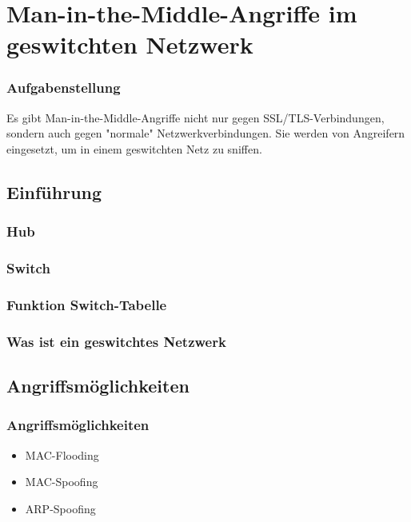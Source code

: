 \documentclass{beamer}
\begin{document}
    \section{Man-in-the-Middle-Angriffe im geswitchten Netzwerk}
    	
    	\begin{frame}
    		\frametitle{Aufgabenstellung}
    		Es gibt Man-in-the-Middle-Angriffe nicht nur gegen SSL/TLS-Verbindungen, sondern auch gegen "normale" Netzwerkverbindungen. Sie werden von Angreifern eingesetzt, um in einem geswitchten Netz zu sniffen.
        \end{frame}
        \subsection*{Einführung}
        \begin{frame}
        	\frametitle{Hub}
            	
        \end{frame}
        
        \begin{frame}
          	\frametitle{Switch}
                  	
        \end{frame}
        
        \begin{frame}
        	\frametitle{Funktion Switch-Tabelle}
                       	
    	\end{frame}
    	
        \begin{frame}
        	\frametitle{Was ist ein geswitchtes Netzwerk}
                       	
    	\end{frame}
    	\subsection*{Angriffsmöglichkeiten}
        \begin{frame}
        	\frametitle{Angriffsmöglichkeiten}
        	
        	\begin{itemize}
        	\pause
        	\item MAC-Flooding
        	\pause
        	\item MAC-Spoofing
        	\pause
        	\item ARP-Spoofing
        	\end{itemize}
                       	
    	\end{frame}
    	
\end{document}
